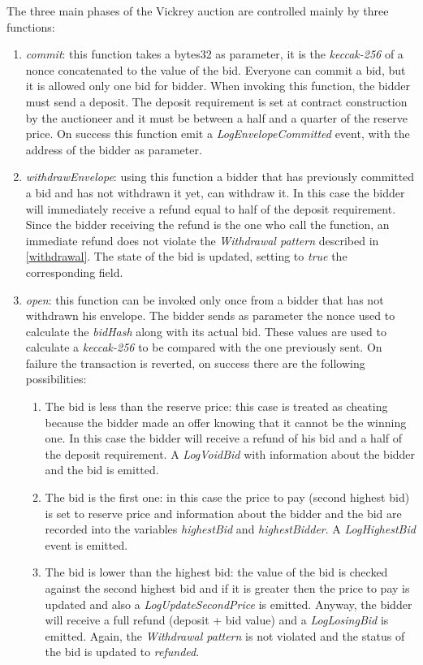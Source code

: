 \documentclass{article}
\begin{document}
The three main phases of the Vickrey auction are controlled mainly by three functions:
\begin{enumerate}
    \item \textit{commit}: this function takes a bytes32 as parameter, it is the \textit{keccak-256} of a nonce concatenated to the value of the bid. Everyone can commit a bid, but it is allowed only one bid for bidder. When invoking this function, the bidder must send a deposit. The deposit requirement is set at contract construction by the auctioneer and it must be between a half and a quarter of the reserve price. On success this function emit a \textit{LogEnvelopeCommitted} event, with the address of the bidder as parameter.
    \item \textit{withdrawEnvelope}: using this function a bidder that has previously committed a bid and has not withdrawn it yet, can withdraw it. In this case the bidder will immediately receive a refund equal to half of the deposit requirement. Since the bidder receiving the refund is the one who call the function, an immediate refund does not violate the \textit{Withdrawal pattern} described in \ref{withdrawal}. The state of the bid is updated, setting to \textit{true} the corresponding field.
    \item \textit{open}: this function can be invoked only once from a bidder that has not withdrawn his envelope. The bidder sends as parameter the nonce used to calculate the \textit{bidHash} along with its actual bid. These values are used to calculate a \textit{keccak-256} to be compared with the one previously sent. On failure the transaction is reverted, on success there are the following possibilities:
    \begin{enumerate}
        \item The bid is less than the reserve price: this case is treated as cheating because the bidder made an offer knowing that it cannot be the winning one. In this case the bidder will receive a refund of his bid and a half of the deposit requirement. A \textit{LogVoidBid} with information about the bidder and the bid is emitted.
        \item The bid is the first one: in this case the price to pay (second highest bid) is set to reserve price and information about the bidder and the bid are recorded into the variables \textit{highestBid} and \textit{highestBidder}. A \textit{LogHighestBid} event is emitted.
        \item The bid is lower than the highest bid: the value of the bid is checked against the second highest bid and if it is greater then the price to pay is updated and also a \textit{LogUpdateSecondPrice} is emitted. Anyway, the bidder will receive a full refund (deposit + bid value) and a \textit{LogLosingBid} is emitted. Again, the \textit{Withdrawal pattern} is not violated and the status of the bid is updated to \textit{refunded}.

\end{enumerate}
\end{enumerate}
\end{document}
